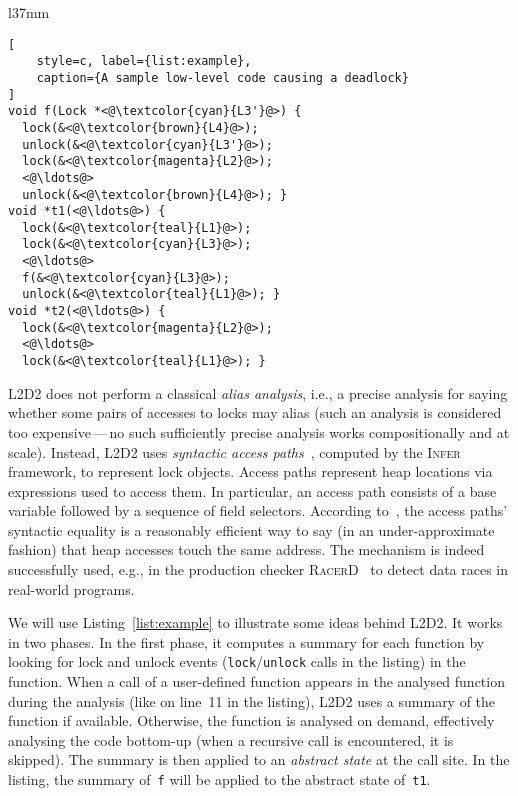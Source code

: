 \documentclass[runningheads]{llncs}
\newcommand{\LLDD}{\textsc{L2D2}\xspace} %
\newcommand{\Infer}{\textsc{Infer}\xspace}
\begin{document}
\begin{wrapfigure}{l}{37mm}
\vspace*{-10mm}
\begin{lstlisting}[
    style=c, label={list:example},
    caption={A sample low-level code causing a deadlock}
]
void f(Lock *<@\textcolor{cyan}{L3'}@>) {
  lock(&<@\textcolor{brown}{L4}@>);
  unlock(&<@\textcolor{cyan}{L3'}@>);
  lock(&<@\textcolor{magenta}{L2}@>);
  <@\ldots@>
  unlock(&<@\textcolor{brown}{L4}@>); }
void *t1(<@\ldots@>) {
  lock(&<@\textcolor{teal}{L1}@>);
  lock(&<@\textcolor{cyan}{L3}@>);
  <@\ldots@>
  f(&<@\textcolor{cyan}{L3}@>);
  unlock(&<@\textcolor{teal}{L1}@>); }
void *t2(<@\ldots@>) {
  lock(&<@\textcolor{magenta}{L2}@>);
  <@\ldots@>
  lock(&<@\textcolor{teal}{L1}@>); }
\end{lstlisting}
\vspace*{-10mm}
\end{wrapfigure}

\LLDD does not perform a classical \emph{alias analysis}, i.e., a precise
analysis for saying whether some pairs of accesses to locks may alias (such an
analysis is considered too expensive\,---\,no such sufficiently precise analysis
works compositionally and at scale).
%
Instead, \LLDD uses \emph{syntactic access paths}~\cite{ap15}, computed by the
\Infer framework, to represent lock objects. Access paths represent heap
locations via expressions used to access them. In particular, an access path
consists of a base variable followed by a sequence of field selectors.
%
According to~\cite{racerD18}, the access paths' syntactic equality is a
reasonably efficient way to say (in an under-approximate fashion) that heap
accesses touch the same address. The mechanism is indeed successfully used,
e.g., in the production checker \textsc{RacerD}~\cite{racerD18} to detect data
races in real-world programs.

We will use Listing~\ref{list:example} to illustrate some ideas behind \LLDD.
%
It works in two phases. In the first phase, it computes a summary for each
function by looking for lock and unlock events (\texttt{lock}/\texttt{unlock}
calls in the listing) in the function. When a call of a user-defined function
appears in the analysed function during the analysis (like on line~11 in the
listing), \LLDD uses a summary of the function if available. Otherwise, the
function is analysed on demand, effectively analysing the code bottom-up (when a
recursive call is encountered, it is skipped). The summary is then applied to an
\emph{abstract state} at the call site. In the listing, the summary
of~\texttt{f} will be applied to the abstract state of~\texttt{t1}.
\end{document}
